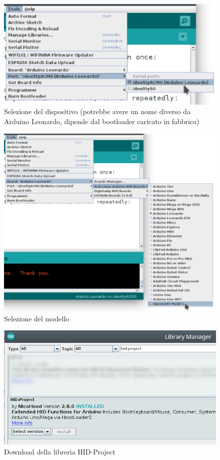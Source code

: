 \begin{figure}[H]
	\centering
	\includegraphics[width=\textwidth]{Dispositivo_files/flashing_03.png}
	\caption{Selezione del dispositivo (potrebbe avere un nome diverso da Arduino Leonardo, dipende dal bootloader caricato in fabbrica)}
	\label{fig:flashing_03}
\end{figure}

\begin{figure}[H]
	\centering
	\includegraphics[width=\textwidth]{Dispositivo_files/flashing_04.png}
	\caption{Selezione del modello}
	\label{fig:flashing_04}
\end{figure}

\begin{figure}[H]
	\centering
	\includegraphics[width=\textwidth]{Dispositivo_files/flashing_06.png}
	\caption{Download della libreria HID-Project}
	\label{fig:flashing_06}
\end{figure}

